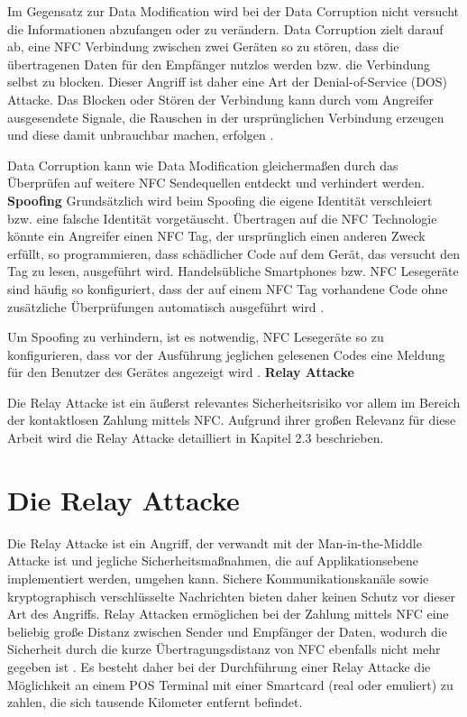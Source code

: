 Im Gegensatz zur Data Modification wird bei der Data Corruption nicht versucht die Informationen abzufangen oder zu verändern. Data Corruption zielt darauf ab, eine NFC Verbindung zwischen zwei Geräten so zu stören, dass die übertragenen Daten für den Empfänger nutzlos werden bzw. die Verbindung selbst zu blocken. Dieser Angriff ist daher eine Art der Denial-of-Service (DOS) Attacke. Das Blocken oder Stören der Verbindung kann durch vom Angreifer ausgesendete Signale, die Rauschen in der ursprünglichen Verbindung erzeugen und diese damit unbrauchbar machen, erfolgen \cite{nfcTechVulnAttack}.

Data Corruption kann wie Data Modification gleichermaßen durch das Überprüfen auf weitere NFC Sendequellen entdeckt und verhindert werden. 
\newline
\newline
\textbf{Spoofing}
Grundsätzlich wird beim Spoofing die eigene Identität verschleiert bzw. eine falsche Identität vorgetäuscht. Übertragen auf die NFC Technologie könnte ein 
Angreifer einen NFC Tag, der ursprünglich einen anderen Zweck erfüllt, so programmieren, dass schädlicher Code auf dem Gerät, das versucht den Tag zu lesen, ausgeführt wird. Handelsübliche Smartphones bzw. NFC Lesegeräte sind häufig so konfiguriert, dass der auf einem NFC Tag vorhandene Code ohne zusätzliche Überprüfungen automatisch ausgeführt wird \cite{nfcTechVulnAttack}. 

Um Spoofing zu verhindern, ist es notwendig, NFC Lesegeräte so zu konfigurieren, dass vor der Ausführung jeglichen gelesenen Codes eine Meldung für den Benutzer des Gerätes angezeigt wird \cite{nfcTechVulnAttack}. 
\newline
\newline
\textbf{Relay Attacke}

Die Relay Attacke ist ein äußerst relevantes Sicherheitsrisiko vor allem im Bereich der kontaktlosen Zahlung mittels NFC. Aufgrund ihrer großen Relevanz für diese Arbeit wird die Relay Attacke detailliert in Kapitel 2.3 beschrieben.

\section{Die Relay Attacke}

Die Relay Attacke ist ein Angriff, der verwandt mit der Man-in-the-Middle Attacke ist und jegliche Sicherheitsmaßnahmen, die auf Applikationsebene implementiert werden, umgehen kann. Sichere Kommunikationskanäle sowie kryptographisch verschlüsselte Nachrichten bieten daher keinen Schutz vor dieser Art des Angriffs. 
Relay Attacken ermöglichen bei der Zahlung mittels NFC eine beliebig große Distanz zwischen Sender und Empfänger der Daten, wodurch die Sicherheit durch die kurze Übertragungsdistanz von NFC ebenfalls nicht mehr gegeben ist \cite{nfcRelayWithOffTheShelfHardAndSoftware}. Es besteht daher bei der Durchführung einer Relay Attacke die Möglichkeit an einem POS Terminal mit einer Smartcard (real oder emuliert) zu zahlen, die sich tausende Kilometer entfernt befindet. 

